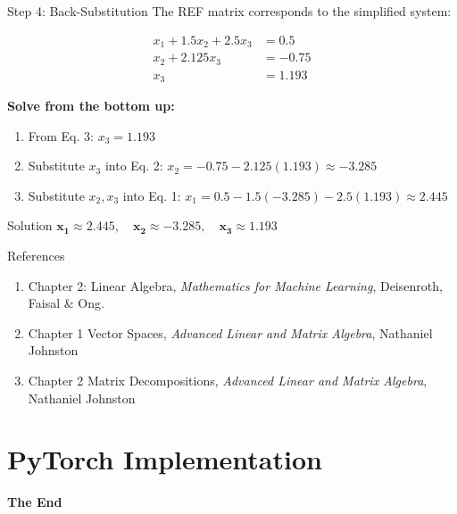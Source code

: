 \documentclass[aspectratio=169,xcolor=dvipsnames,svgnames,x11names,fleqn]{beamer}
\begin{document}
\begin{frame}{Step 4: Back-Substitution}
\centering
The REF matrix corresponds to the simplified system:

\vspace{3mm}
\begin{align*}
x_1 + 1.5x_2 + 2.5x_3 &= 0.5 \\
x_2 + 2.125x_3 &= -0.75 \\
x_3 &= 1.193
\end{align*}

\vspace{5mm}
\textbf{Solve from the bottom up:}
\begin{enumerate}
    \item From Eq. 3: \alert{$x_3 = 1.193$}
    \item Substitute $x_3$ into Eq. 2: $x_2 = -0.75 - 2.125(1.193) \approx -3.285$
    \item Substitute $x_2, x_3$ into Eq. 1: $x_1 = 0.5 - 1.5(-3.285) - 2.5(1.193) \approx 2.445$
\end{enumerate}

\vspace{3mm}
\begin{block}{Solution}
$\mathbf{x_1 \approx 2.445, \quad x_2 \approx -3.285, \quad x_3 \approx 1.193}$
\end{block}
\end{frame}

\begin{frame}{References}

    \begin{enumerate}
        \item Chapter 2: Linear Algebra, \textit{Mathematics for Machine Learning}, Deisenroth, Faisal \& Ong.
        \item Chapter 1 Vector Spaces, \textit{Advanced Linear and Matrix Algebra}, Nathaniel Johnston
        \item Chapter 2 Matrix Decompositions, \textit{Advanced Linear and Matrix Algebra}, Nathaniel Johnston
    \end{enumerate}
    
\end{frame}


\section{PyTorch Implementation}

\begin{frame}
    \sectionpage
\end{frame}


\begin{frame}
    \Huge{\centerline{\color{bubblegumPink}\textbf{The End}}}
\end{frame}
\end{document}
